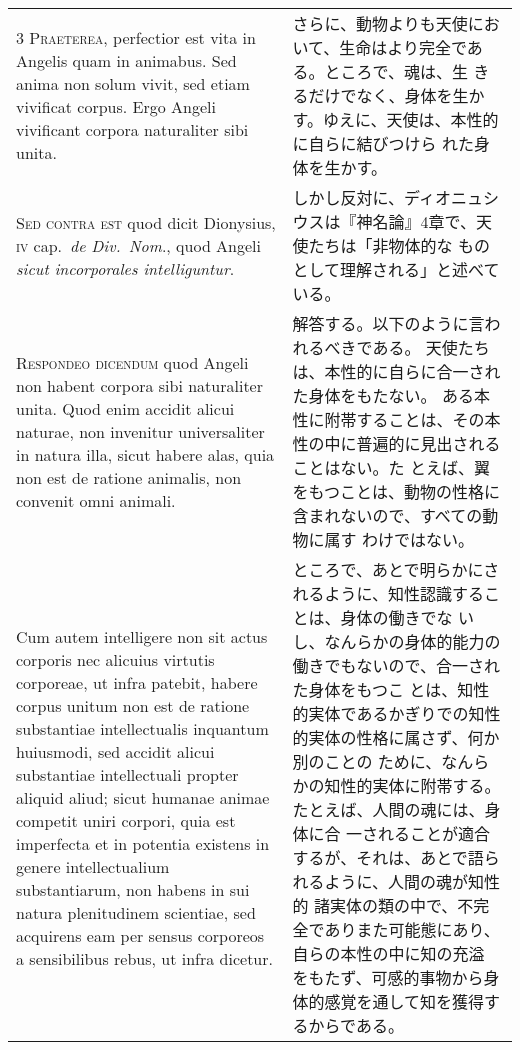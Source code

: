\documentclass[10pt]{jsarticle} %
\begin{document}
\begin{longtable}{p{21em}p{21em}}
{\scshape 3 Praeterea}, perfectior est vita in Angelis
quam in animabus. Sed anima non solum vivit, sed etiam vivificat
corpus. Ergo Angeli vivificant corpora naturaliter sibi unita.


&

さらに、動物よりも天使において、生命はより完全である。ところで、魂は、生
 きるだけでなく、身体を生かす。ゆえに、天使は、本性的に自らに結びつけら
 れた身体を生かす。

\\


 {\scshape Sed contra est} quod dicit Dionysius, {\scshape iv} cap.~{\itshape de
Div.~Nom}., quod Angeli {\itshape sicut incorporales intelliguntur}.


&

しかし反対に、ディオニュシウスは『神名論』4章で、天使たちは「非物体的な
 ものとして理解される」と述べている。


\\


{\scshape Respondeo dicendum} quod Angeli non habent
corpora sibi naturaliter unita. Quod enim accidit alicui naturae, non
invenitur universaliter in natura illa, sicut habere alas, quia non est
de ratione animalis, non convenit omni animali. 


&

解答する。以下のように言われるべきである。
天使たちは、本性的に自らに合一された身体をもたない。
ある本性に附帯することは、その本性の中に普遍的に見出されることはない。た
 とえば、翼をもつことは、動物の性格に含まれないので、すべての動物に属す
 わけではない。

\\



Cum autem intelligere
non sit actus corporis nec alicuius virtutis corporeae, ut infra
patebit, habere corpus unitum non est de ratione substantiae
intellectualis inquantum huiusmodi, sed accidit alicui substantiae
intellectuali propter aliquid aliud; sicut humanae animae competit uniri
corpori, quia est imperfecta et in potentia existens in genere
intellectualium substantiarum, non habens in sui natura plenitudinem
scientiae, sed acquirens eam per sensus corporeos a sensibilibus rebus,
ut infra dicetur. 


&

ところで、あとで明らかにされるように、知性認識することは、身体の働きでな
 いし、なんらかの身体的能力の働きでもないので、合一された身体をもつこ
 とは、知性的実体であるかぎりでの知性的実体の性格に属さず、何か別のことの
 ために、なんらかの知性的実体に附帯する。たとえば、人間の魂には、身体に合
 一されることが適合するが、それは、あとで語られるように、人間の魂が知性的
 諸実体の類の中で、不完全でありまた可能態にあり、自らの本性の中に知の充溢
 をもたず、可感的事物から身体的感覚を通して知を獲得するからである。



\end{longtable}
\end{document}
